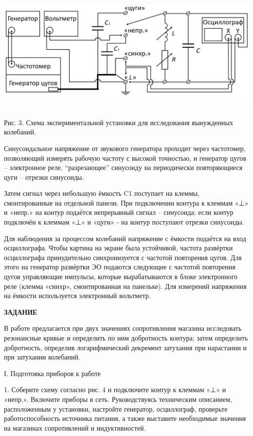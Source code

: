 \includegraphics[width=6.49653in,height=2.48056in]{./media/image3.png}

Рис. 3. Схема экспериментальной установки для исследования вынужденных
колебаний.

Синусоидальное напряжение от звукового генератора проходит через
частотомер, позволяющий измерять рабочую частоту с высокой точностью, и
генератор цугов -- электронное реле, ``разрезающее'' синусоиду на
периодически повторяющиеся цуги -- отрезки синусоиды.

Затем сигнал через небольшую ёмкость C1 поступает на клеммы,
смонтированные на отдельной панели. При подключении контура к клеммам
«⊥» и «непр.» на контур подаётся непрерывный сигнал -- синусоида; если
контур подключён к клеммам «⊥» и «цуги» - на контур поступают отрезки
синусоиды.

Для наблюдения за процессом колебаний напряжение с ёмкости подаётся на
вход осциллографа. Чтобы картина на экране была устойчивой, частота
развёртки осциллографа принудительно синхронизуется с частотой
повторения цугов. Для этого на генератор развёртки ЭО подаются следующие
с частотой повторения цугов управляющие импульсы, которые вырабатываются
в блоке электронного реле (клемма «синхр», смонтированная на панельке).
Для измерений напряжения на ёмкости используется электронный вольтметр.

\textbf{ЗАДАНИЕ}

В работе предлагается при двух значениях сопротивления магазина
исследовать резонансные кривые и определить по ним добротность контура;
затем определить добротность, определив логарифмический декремент
затухания при нарастании и при затухании колебаний.

I. Подготовка приборов к работе

1. Соберите схему согласно рис. 4 и подключите контур к клеммам «⊥» и
«непр.». Включите приборы в сеть. Руководствуясь техническим описанием,
расположенным у установки, настройте генератор, осциллограф, проверьте
работоспособность источника питания, а также выставите необходимые
значения на магазинах сопротивлений и индуктивностей.

